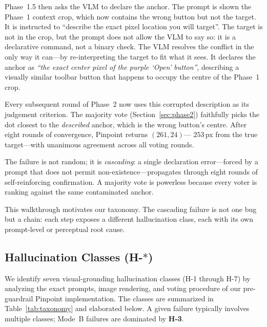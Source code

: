 Phase~1.5 then asks the VLM to declare the anchor.  The prompt is
shown the Phase~1 context crop, which now contains the wrong button
but not the target.  It is instructed to ``describe the exact pixel
location you will target''.  The target is not in the crop, but the
prompt does not allow the VLM to say so: it is a declarative command,
not a binary check.  The VLM resolves the conflict in the only way it
can---by re-interpreting the target to fit what it sees.  It declares
the anchor as \emph{``the exact center pixel of the purple `Open'
button''}, describing a visually similar toolbar button that happens
to occupy the centre of the Phase~1 crop.

Every subsequent round of Phase~2 now uses this corrupted description
as its judgement criterion.  The majority vote
(Section~\ref{sec:phase2}) faithfully picks the dot closest to
the \emph{described} anchor, which is the wrong button's centre.
After eight rounds of convergence, Pinpoint returns $(261, 24)$---
$253$\,px from the true target---with unanimous agreement across
all voting rounds.

The failure is not random; it is \emph{cascading}: a single
declaration error---forced by a prompt that does not permit
non-existence---propagates through eight rounds of self-reinforcing
confirmation.  A majority vote is powerless because every voter is
ranking against the same contaminated anchor.

This walkthrough motivates our taxonomy.  The cascading failure is
not one bug but a chain: each step exposes a different hallucination
class, each with its own prompt-level or perceptual root cause.

\subsection{Hallucination Classes (H-$\ast$)}
\label{sec:taxonomy-classes}

We identify seven visual-grounding hallucination classes (H-1
through H-7) by analyzing the exact prompts, image rendering,
and voting procedure of our pre-guardrail Pinpoint implementation.  The
classes are summarized in Table~\ref{tab:taxonomy} and elaborated
below.  A given failure
typically involves multiple classes; Mode~B failures are dominated by
\textbf{H-3}.

